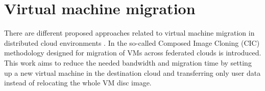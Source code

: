 %
%
%
%
%
%
%


\section{Virtual machine migration}

There are different proposed approaches related to virtual machine migration in distributed cloud environments \cite{celesti2010improving, malet2010resource}. In \cite{celesti2010improving} the so-called Composed Image Cloning (CIC) methodology designed for migration of VMs across federated clouds is introduced. This work aims to reduce the needed bandwidth and migration time by setting up a new virtual machine in the destination cloud and transferring only user data instead of relocating the whole VM disc image. 

